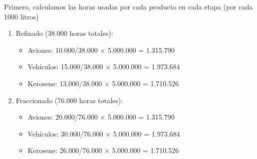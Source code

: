 \documentclass[10pt,a4paper]{article}
\begin{document}
\begin{enumerate}
    Primero, calculamos las horas usadas por cada producto en cada etapa (por cada 1000 litros)

    \begin{center}
    \end{center}

    \vspace{0.5em}

    \begin{enumerate}[label=\alph*)]

        \item Refinado (38.000 horas totales):
        
        \begin{itemize}

            \item Aviones: 10.000/38.000 × 5.000.000 = 1.315.790
            \item Vehículos: 15.000/38.000 × 5.000.000 = 1.973.684
            \item Kerosene: 13.000/38.000 × 5.000.000 = 1.710.526 \\
    
        \end{itemize}

        \item Fraccionado (76.000 horas totales):
        
        \begin{itemize}

            \item Aviones: 20.000/76.000 × 5.000.000 = 1.315.790
            \item Vehículos: 30.000/76.000 × 5.000.000 = 1.973.684
            \item Kerosene: 26.000/76.000 × 5.000.000 = 1.710.526 \\
    

\end{itemize}
\end{enumerate}
\end{enumerate}
\end{document}
